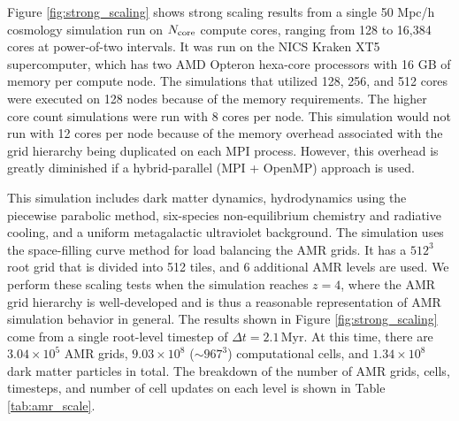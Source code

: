 Figure \ref{fig:strong_scaling} shows strong scaling results from a
single 50 Mpc/h cosmology simulation run on $N_{\rm core}$ compute
cores, ranging from 128 to 16,384 cores at power-of-two intervals.  It
was run on the NICS Kraken XT5 supercomputer, which has two AMD
Opteron hexa-core processors with 16 GB of memory per compute node.
The simulations that utilized 128, 256, and 512 cores were executed on
128 nodes because of the memory requirements.  The higher core count
simulations were run with 8 cores per node.  This simulation would not
run with 12 cores per node because of the memory overhead associated
with the grid hierarchy being duplicated on each MPI process.
However, this overhead is greatly diminished if a hybrid-parallel (MPI
+ OpenMP) approach is used.

This simulation includes dark matter dynamics, hydrodynamics using the
piecewise parabolic method, six-species non-equilibrium chemistry and
radiative cooling, and a uniform metagalactic ultraviolet background.
The simulation uses the space-filling curve method for load balancing
the AMR grids.  It has a $512^3$ root grid that is divided into 512
tiles, and 6 additional AMR levels are used.  We perform these scaling
tests when the simulation reaches $z=4$, where the AMR grid hierarchy
is well-developed and is thus a reasonable representation of AMR
simulation behavior in general.  The results shown in Figure
\ref{fig:strong_scaling} come from a single root-level timestep
of $\Delta t = 2.1\, \textrm{Myr}$.  At this time, there are $3.04 \times
10^5$ AMR grids, $9.03 \times 10^8$ ($\sim 967^3$) computational
cells, and $1.34 \times 10^8$ dark matter particles in total.  The
breakdown of the number of AMR grids, cells, timesteps, and number of
cell updates on each level is shown in Table \ref{tab:amr_scale}.

